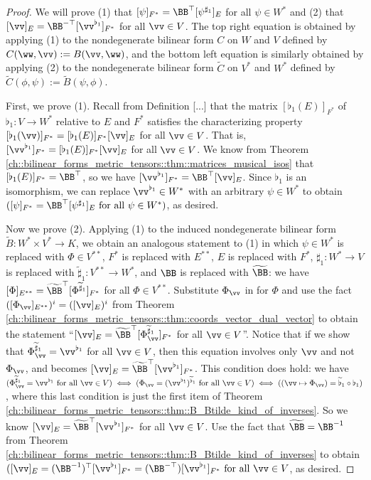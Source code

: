 \begin{proof}
    We will prove (1) that $[\psi]_{F^*} = \BB^\top [\psi^{\sharp_1}]_E$ for all $\psi \in W^*$ and (2) that $[\vv]_E = \BB^{-\top} [\vv^{\flat_1}]_{F^*}$ for all $\vv \in V$. The top right equation is obtained by applying (1) to the nondegenerate bilinear form $C$ on $W$ and $V$ defined by $C(\ww, \vv) := B(\vv, \ww)$, and the bottom left equation is similarly obtained by applying (2) to the nondegenerate bilinear form $\widetilde{C}$ on $V^*$ and $W^*$ defined by $\widetilde{C}(\phi, \psi) := \widetilde{B}(\psi, \phi)$.

    First, we prove (1). Recall from Definition [...] that the matrix $[\flat_1(E)]_{F^*}$ of $\flat_1:V \rightarrow W^*$ relative to $E$ and $F^*$ satisfies the characterizing property $[\flat_1(\vv)]_{F^*} = [\flat_1(E)]_{F^*} [\vv]_E$ for all $\vv \in V$. That is, $[\vv^{\flat_1}]_{F^*} = [\flat_1(E)]_{F^*} [\vv]_E$ for all $\vv \in V$. We know from Theorem \ref{ch::bilinear_forms_metric_tensors::thm::matrices_musical_isos} that $[\flat_1(E)]_{F^*} = \BB^\top$, so we have $[\vv^{\flat_1}]_{F^*} = \BB^\top [\vv]_E$. Since $\flat_1$ is an isomorphism, we can replace $\vv^{\flat_1} \in W^*$ with an arbitrary $\psi \in W^*$ to obtain $([\psi]_{F^*} = \BB^\top [\psi^{\sharp_1}]_E \text{ for all } \psi \in W^*)$, as desired.
    
    Now we prove (2). Applying (1) to the induced nondegenerate bilinear form $\widetilde{B}:W^* \times V^* \rightarrow K$, we obtain an analogous statement to (1) in which $\psi \in W^*$ is replaced with $\Phi \in V^{**}$, $F^*$ is replaced with $E^{**}$, $E$ is replaced with $F^*$, $\sharp_1:W^* \rightarrow V$ is replaced with $\widetilde{\sharp}_1:V^{**} \rightarrow W^*$, and $\BB$ is replaced with $\widetilde{\BB}$: we have $[\Phi]_{E^{**}} = \widetilde{\BB}^\top [\Phi^{\widetilde{\sharp}_1}]_{F^*}$ for all $\Phi \in V^{**}$. Substitute $\Phi_\vv$ in for $\Phi$ and use the fact $([\Phi_\vv]_{E^{**}})^i = ([\vv]_E)^i$ from Theorem \ref{ch::bilinear_forms_metric_tensors::thm::coords_vector_dual_vector} to obtain the statement ``$[\vv]_E = \widetilde{\BB}^\top [\Phi_\vv^{\widetilde{\sharp}_1}]_{F^*}$ for all $\vv \in V$''. Notice that if we show that $\Phi_\vv^{\widetilde{\sharp}_1} = \vv^{\flat_1}$ for all $\vv \in V$, then this equation involves only $\vv$ and not $\Phi_\vv$, and becomes $[\vv]_E = \widetilde{\BB}^\top [\vv^{\flat_1}]_{F^*}$. This condition does hold: we have $(\Phi_\vv^{\widetilde{\sharp}_1} = \vv^{\flat_1} \text{ for all } \vv \in V) \iff (\Phi_\vv = (\vv^{\flat_1})^{\widetilde{\flat}_1} \text{ for all } \vv \in V) \iff ((\vv \mapsto \Phi_\vv) = \widetilde{\flat}_1 \circ \flat_1)$, where this last condition is just the first item of Theorem \ref{ch::bilinear_forms_metric_tensors::thm::B_Btilde_kind_of_inverses}. So we know $[\vv]_E = \widetilde{\BB}^\top [\vv^{\flat_1}]_{F^*}$ for all $\vv \in V$. Use the fact that $\widetilde{\BB} = \BB^{-1}$ from Theorem \ref{ch::bilinear_forms_metric_tensors::thm::B_Btilde_kind_of_inverses} to obtain $([\vv]_E = (\BB^{-1})^\top [\vv^{\flat_1}]_{F^*} = (\BB^{-\top}) [\vv^{\flat_1}]_{F^*} \text{ for all $\vv \in V$}$, as desired.
\end{proof}

